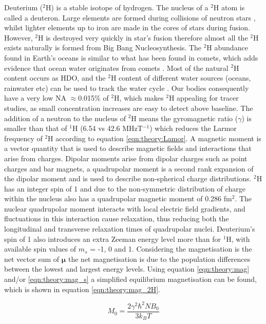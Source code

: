 Deuterium ($^2$H) is a stable isotope of hydrogen. The nucleus of a $^2$H atom is called a deuteron. Large elements are formed during collisions of neutron stars \cite{Watson2019IdentificationStars}, whilst lighter elements up to iron are made in the cores of stars during fusion. However, $^2$H is destroyed very quickly in star's fusion \cite{Patrignani2016ReviewPhysics} therefore almost all the $^2$H exists naturally is formed from Big Bang Nucleosynthesis. The $^2$H abundance found in Earth's oceans is similar to what has been found in comets, which adds evidence that ocean water originates from comets \cite{Hersant2001APlanets}. Most of the natural $^2$H content occurs as \ac{HDO}, and the $^2$H content of different water sources (oceans, rainwater etc) can be used to track the water cycle \cite{Bowen2019IsotopesApplications}. Our bodies consequently have a very low \ac{NA} $\approx$0.015\% of $^2$H, which makes $^2$H appealing for tracer studies, as small concentration increases are easy to detect above baseline. The addition of a neutron to the nucleus of $^2$H means the gyromagnetic ratio ($\gamma$) is smaller than that of $^1$H (6.54 vs 42.6 MHzT$^{-1}$) which reduces the Larmor frequency of $^2$H according to equation \ref{eqn:theory:Lamor}. A magnetic moment is a vector quantity that is used to describe magnetic fields and interactions that arise from charges. Dipolar moments arise from dipolar charges such as point charges and bar magnets, a quadrupolar moment is a second rank expansion of the dipolar moment and is used to describe non-spherical charge distributions. $^2$H has an integer spin of 1 and due to the non-symmetric distribution of charge within the nucleus also has a quadrupolar magnetic moment of 0.286 fm$^2$. The nuclear quadrupolar moment interacts with local electric field gradients, and fluctuations in this interaction cause relaxation, thus reducing both the longitudinal and transverse relaxation times of quadrupolar nuclei. Deuterium's spin of 1 also introduces an extra Zeeman energy level more than for $^1$H, with available spin values of $m_s$ = -1, 0 and 1. Considering the magnetisation is the net vector sum of $\mathbf{\mu}$ the net magnetisation is due to the population differences between the lowest and largest energy levels. Using equation \ref{eqn:theory:mag} and/or \ref{eqn:theory:mag_s} a simplified equilibrium magnetisation can be found, which is shown in equation \ref{eqn:theory:mag_2H}.

\begin{equation}
    M_0 = \frac{2\gamma^2 \hbar^2 N B_0}{3k_BT}
    \label{eqn:theory:mag_2H}
\end{equation}

